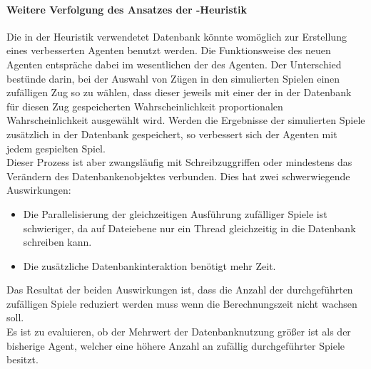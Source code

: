 \paragraph{Weitere Verfolgung des Ansatzes der -Heuristik}
Die in der  Heuristik verwendetet Datenbank könnte womöglich zur Erstellung eines verbesserten Agenten benutzt werden. Die Funktionsweise des neuen Agenten entspräche dabei im wesentlichen der des \mxZitat{\mc} Agenten. Der Unterschied bestünde darin, bei der Auswahl von Zügen in den simulierten Spielen einen zufälligen Zug so zu wählen, dass dieser jeweils mit einer der in der Datenbank für diesen Zug gespeicherten Wahrscheinlichkeit proportionalen Wahrscheinlichkeit ausgewählt wird. Werden die Ergebnisse der simulierten Spiele zusätzlich in der Datenbank gespeichert, so verbessert sich der Agenten mit jedem gespielten Spiel.
\\Dieser Prozess ist aber zwangsläufig mit Schreibzuggriffen oder mindestens das Verändern des Datenbankenobjektes verbunden. Dies hat zwei schwerwiegende Auswirkungen:
\begin{itemize}
\item Die Parallelisierung der gleichzeitigen Ausführung zufälliger Spiele ist schwieriger, da auf Dateiebene nur ein Thread gleichzeitig in die Datenbank schreiben kann.
\item Die zusätzliche Datenbankinteraktion benötigt mehr Zeit.
\end{itemize}
Das Resultat der beiden Auswirkungen ist, dass die Anzahl der durchgeführten zufälligen Spiele reduziert werden muss wenn die Berechnungszeit nicht wachsen soll.
\\Es ist zu evaluieren, ob der Mehrwert der Datenbanknutzung größer ist als der bisherige \mxZitat{\mc} Agent, welcher eine höhere Anzahl an zufällig durchgeführter Spiele besitzt.

